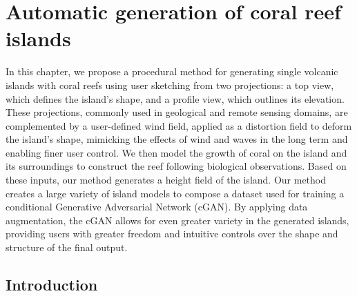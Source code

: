 \resetgraphicspath
{}

\chapter{Automatic generation of coral reef islands}
\label{chap:coral-island}

\abstract
In this chapter, we propose a procedural method for generating single volcanic islands with coral reefs using user sketching from two projections: a top view, which defines the island's shape, and a profile view, which outlines its elevation. These projections, commonly used in geological and remote sensing domains, are complemented by a user-defined wind field, applied as a distortion field to deform the island's shape, mimicking the effects of wind and waves in the long term and enabling finer user control. We then model the growth of coral on the island and its surroundings to construct the reef following biological observations. Based on these inputs, our method generates a height field of the island. Our method creates a large variety of island models to compose a dataset used for training a conditional Generative Adversarial Network (cGAN). By applying data augmentation, the cGAN allows for even greater variety in the generated islands, providing users with greater freedom and intuitive controls over the shape and structure of the final output.
\pagebreak

\minitoc

\section{Introduction}
\label{sec:coral-island-introduction}

